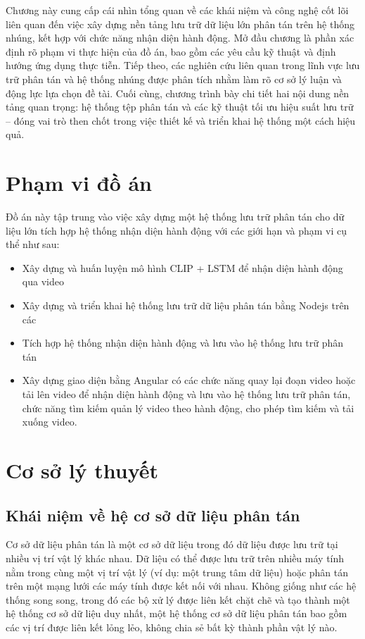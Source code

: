 \documentclass[../main.tex]{subfiles}
\begin{document}
Chương này cung cấp cái nhìn tổng quan về các khái niệm và công nghệ cốt lõi liên quan đến việc xây dựng nền tảng lưu trữ dữ liệu lớn phân tán trên hệ thống nhúng, kết hợp với chức năng nhận diện hành động. Mở đầu chương là phần xác định rõ phạm vi thực hiện của đồ án, bao gồm các yêu cầu kỹ thuật và định hướng ứng dụng thực tiễn. Tiếp theo, các nghiên cứu liên quan trong lĩnh vực lưu trữ phân tán và hệ thống nhúng được phân tích nhằm làm rõ cơ sở lý luận và động lực lựa chọn đề tài. Cuối cùng, chương trình bày chi tiết hai nội dung nền tảng quan trọng: hệ thống tệp phân tán và các kỹ thuật tối ưu hiệu suất lưu trữ – đóng vai trò then chốt trong việc thiết kế và triển khai hệ thống một cách hiệu quả.
\section{Phạm vi đồ án}
Đồ án này tập trung vào việc xây dựng một hệ thống lưu trữ phân tán cho dữ liệu lớn tích hợp hệ thống nhận diện hành động với các giới hạn và phạm vi cụ thể như sau:


\begin{itemize}
   \item Xây dựng và huấn luyện mô hình CLIP + LSTM để nhận diện hành động qua video
   \item Xây dựng và triển khai hệ thống lưu trữ dữ liệu phân tán bằng Nodejs trên các 
   \item Tích hợp hệ thống nhận diện hành động và lưu vào hệ thống lưu trữ phân tán
   \item Xây dựng giao diện bằng Angular có các chức năng quay lại đoạn video hoặc tải lên video để nhận diện hành động và lưu vào hệ thống lưu trữ phân tán, chức năng tìm kiếm quản lý video theo hành động, cho phép tìm kiếm và tải xuống video.
\end{itemize}

\section{Cơ sở lý thuyết}
\subsection{Khái niệm về hệ cơ sở dữ liệu phân tán}
Cơ sở dữ liệu phân tán là một cơ sở dữ liệu trong đó dữ liệu được lưu trữ tại nhiều vị trí vật lý khác nhau. Dữ liệu có thể được lưu trữ trên nhiều máy tính nằm trong cùng một vị trí vật lý (ví dụ: một trung tâm dữ liệu) hoặc phân tán trên một mạng lưới các máy tính được kết nối với nhau. Không giống như các hệ thống song song, trong đó các bộ xử lý được liên kết chặt chẽ và tạo thành một hệ thống cơ sở dữ liệu duy nhất, một hệ thống cơ sở dữ liệu phân tán bao gồm các vị trí được liên kết lỏng lẻo, không chia sẻ bất kỳ thành phần vật lý nào.
\end{document}
